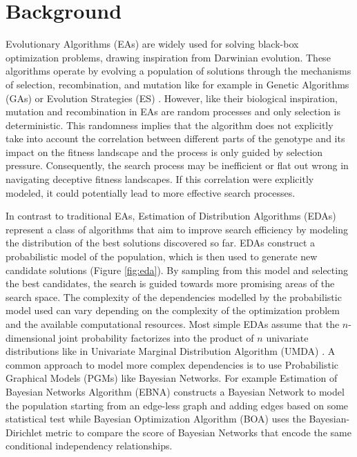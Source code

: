 \section{Background}
\label{sec:background}

Evolutionary Algorithms (EAs) are widely used for solving black-box optimization problems, drawing inspiration from Darwinian evolution. These algorithms operate by evolving a population of solutions through the mechanisms of selection, recombination, and mutation like for example in Genetic Algorithms (GAs) \cite{holland_ga_1992} or Evolution Strategies (ES) \cite{back_es_1996}. However, like their biological inspiration, mutation and recombination in EAs are random processes and only selection is deterministic. This randomness implies that the algorithm does not explicitly take into account the correlation between different parts of the genotype and its impact on the fitness landscape and the process is only guided by selection pressure. Consequently, the search process may be inefficient or flat out wrong in navigating deceptive fitness landscapes. If this correlation were explicitly modeled, it could potentially lead to more effective search processes.

In contrast to traditional EAs, Estimation of Distribution Algorithms (EDAs) \cite{larranaga_estimation_2002} represent a class of algorithms that aim to improve search efficiency by modeling the distribution of the best solutions discovered so far. EDAs construct a probabilistic model of the population, which is then used to generate new candidate solutions (Figure \ref{fig:eda}). By sampling from this model and selecting the best candidates, the search is guided towards more promising areas of the search space. The complexity of the dependencies modelled by the probabilistic model used can vary depending on the complexity of the optimization problem and the available computational resources. Most simple EDAs assume that the $n$-dimensional joint probability factorizes into the product of $n$ univariate distributions like in Univariate Marginal Distribution Algorithm (UMDA) \cite{muhlenbein_umda_1997}. A common approach to model more complex dependencies is to use Probabilistic Graphical Models (PGMs) like Bayesian Networks. For example Estimation of Bayesian Networks Algorithm (EBNA) \cite{larranaga_ebna_2000} constructs a Bayesian Network to model the population starting from an edge-less graph and adding edges based on some statistical test while Bayesian Optimization Algorithm (BOA) \cite{pelikan_boa_2005} uses the Bayesian-Dirichlet metric to compare the score of Bayesian Networks that encode the same conditional independency relationships.

